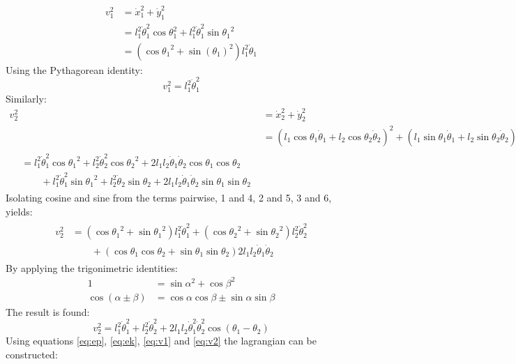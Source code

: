 \begin{align}
	v_1^2 &= \dot{x}_1^2+\dot{y}_1^2\\
		&= l_1^2\dot{\theta}_1^2\cos{\theta}_1^2+l_1^2\dot{\theta}_1^2\sin{\theta_1}^2\\
		&= (\cos{\theta_1}^2+\sin(\theta_1)^2)l_1^2\dot{\theta}_1
\end{align}
Using the Pythagorean identity:
\begin{equation}
	\label{eq:v1}
	v_1^2 = l_1^2\dot{\theta}_1^2
\end{equation}
Similarly:
\begin{align}
	v_2^2 &= \dot{x}_2^2+\dot{y}_2^2\\
	&= (l_1\cos{\theta}_1\dot{\theta}_1 + l_2\cos{\theta_2}\dot{\theta}_2)^2+(l_1\sin{\theta}_1\dot{\theta}_1 + l_2\sin{\theta_2}\dot{\theta}_2)^2\\
	\begin{split}
		&= l_1^2\dot\theta_1^2\cos{\theta_1}^2+l_2^2\dot\theta_2^2\cos{\theta_2}^2+2l_1l_2\dot\theta_1\dot\theta_2\cos{\theta_1}\cos{\theta_2}\\
		&\qquad +l_1^2\dot\theta_1^2\sin{\theta_1}^2+l_2^2\dot\theta_2\sin{\theta_2}+2l_1l_2\dot\theta_1\dot\theta_2\sin{\theta_1}\sin{\theta_2}
	\end{split}
\end{align}
Isolating cosine and sine from the terms pairwise, 1 and 4, 2 and 5, 3 and 6, yields:
\begin{align}
	\begin{split}
		v_2^2&=(\cos{\theta_1}^2+\sin{\theta_1}^2)l_1^2\dot\theta_1^2+(\cos{\theta_2}^2+\sin{\theta_2}^2)l_2^2\dot\theta_2^2\\
	&\qquad+(\cos{\theta_1}\cos{\theta_2}+\sin{\theta_1}\sin{\theta_2})2l_1l_2\dot\theta_1\dot\theta_2
	\end{split}
\end{align}
By applying the trigonimetric identities:
\begin{align}
	1&=\sin{\alpha^2}+\cos{\beta^2}\\
	\cos{(\alpha\pm\beta)}&=\cos\alpha\cos\beta\pm\sin\alpha\sin\beta
\end{align}
The result is found:
\begin{equation}
	\label{eq:v2}
	v_2^2=l_1^2\dot\theta_1^2+l_2^2\dot\theta_2^2+2l_1l_2\dot\theta_1^2\dot\theta_2^2\cos{(\theta_1-\theta_2)}
\end{equation}
Using equations \ref{eq:ep}, \ref{eq:ek}, \ref{eq:v1} and \ref{eq:v2} the lagrangian can be constructed:
